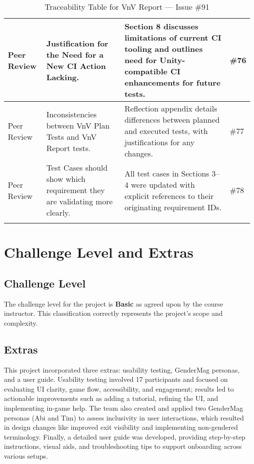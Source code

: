 \documentclass{article}
\begin{document}
\begin{longtable}{|p{2cm}|p{5cm}|p{5cm}|p{2cm}|}
\hline
Peer Review & Justification for the Need for a New CI Action Lacking. & Section 8 discusses limitations of current CI tooling and outlines need for Unity-compatible CI enhancements for future tests. & \#76 \\
\hline
Peer Review & Inconsistencies between VnV Plan Tests and VnV Report tests. & Reflection appendix details differences between planned and executed tests, with justifications for any changes. & \#77 \\
\hline
Peer Review & Test Cases should show which requirement they are validating more clearly. & All test cases in Sections 3–4 were updated with explicit references to their originating requirement IDs. & \#78 \\
\hline
\caption{Traceability Table for VnV Report — Issue \#91}
\end{longtable}


\section{Challenge Level and Extras}

\subsection{Challenge Level}
The challenge level for the project is \textbf{Basic} as agreed upon by the course instructor. This classification correctly represents the project's scope and complexity.


\subsection{Extras}
This project incorporated three extras: usability testing, GenderMag personas, and a user guide. Usability testing involved 17 participants and focused on evaluating UI clarity, game flow, accessibility, and engagement; results led to actionable improvements such as adding a tutorial, refining the UI, and implementing in-game help. The team also created and applied two GenderMag personas (Abi and Tim) to assess inclusivity in user interactions, which resulted in design changes like improved exit visibility and implementing non-gendered terminology. Finally, a detailed user guide was developed, providing step-by-step instructions, visual aids, and troubleshooting tips to support onboarding across various setups.
\end{document}
